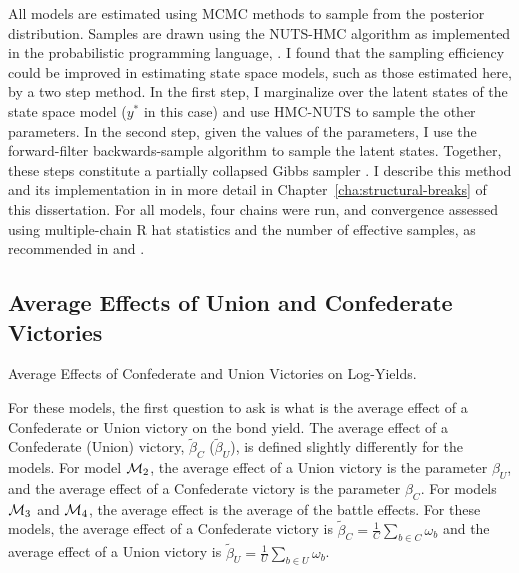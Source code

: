 All models are estimated using MCMC methods to sample from the posterior distribution.
Samples are drawn using the NUTS-HMC algorithm \parencite{HoffmanGelman2014a} as implemented in the probabilistic programming language, \Stan{} \parencites{Stan2015a}.
I found that the sampling efficiency could be improved in estimating state space models, such as those estimated here, by a two step method.
In the first step, I marginalize over the latent states of the state space model ($y^{*}$ in this case) and use HMC-NUTS to sample the other parameters.
In the second step, given the values of the parameters, I use the forward-filter backwards-sample algorithm  to sample the latent states.
Together, these steps constitute a partially collapsed Gibbs sampler \parencite{VanDykPark2008a}.
I describe this method and its implementation in \Stan{} in more detail in Chapter~\ref{cha:structural-breaks} of this dissertation.
For all models, four chains were run, and convergence assessed using multiple-chain R hat statistics and the number of effective samples, as recommended in \parencites{Stan2015a} and \textcite{GelmanCarlinSternEtAl2013a}.



\subsection{Average Effects of Union and Confederate Victories}
\label{sec:future-battles}

\begin{table}
  \centering
  
  \caption{Average Effects of Confederate and Union Victories on Log-Yields.}
  \label{bonds:tab:avg_battle_effects}
\end{table}

For these models, the first question to ask is what is the average effect of a Confederate or Union victory on the bond yield.
The average effect of a Confederate (Union) victory, $\tilde{\beta}_{C}$ ($\tilde{\beta}_{U}$), is defined slightly differently for the models.
For model $\mathcal{M}_{\text{2}}$, the average effect of a Union victory is the parameter $\beta_{U}$, and the average effect of a Confederate victory is the parameter $\beta_{C}$. 
For models $\mathcal{M}_{\text{3}}$ and $\mathcal{M}_{\text{4}}$, the average effect is the average of the battle effects.
For these models, the average effect of a Confederate victory is $\tilde{\beta}_{C} = \frac{1}{C}\sum_{b \in C} \omega_{b}$ and the average effect of a Union victory is $\tilde{\beta}_{U} = \frac{1}{U}\sum_{b \in U} \omega_{b}$.

